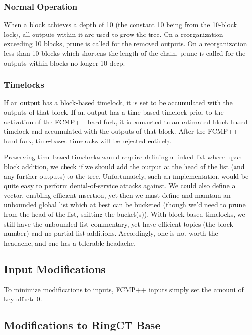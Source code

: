 \documentclass[]{article}
\begin{document}
\subsubsection{Normal Operation}

When a block achieves a depth of 10 (the constant 10 being from the 10-block lock), all outputs within it are used to grow the tree. On a reorganization exceeding 10 blocks, prune is called for the removed outputs. On a reorganization less than 10 blocks which shortens the length of the chain, prune is called for the outputs within blocks no-longer 10-deep.

\subsubsection{Timelocks}

If an output has a block-based timelock, it is set to be accumulated with the outputs of that block. If an output has a time-based timelock prior to the activation of the FCMP++ hard fork, it is converted to an estimated block-based timelock and accumulated with the outputs of that block. After the FCMP++ hard fork, time-based timelocks will be rejected entirely.

Preserving time-based timelocks would require defining a linked list where upon block addition, we check if we should add the output at the head of the list (and any further outputs) to the tree. Unfortunately, such an implementation would be quite easy to perform denial-of-service attacks against. We could also define a vector, enabling efficient insertion, yet then we must define and maintain an unbounded global list which at best can be bucketed (though we'd need to prune from the head of the list, shifting the bucket(s)). With block-based timelocks, we still have the unbounded list commentary, yet have efficient topics (the block number) and no partial list additions. Accordingly, one is not worth the headache, and one has a tolerable headache.

\subsection{Input Modifications}

To minimize modifications to inputs, FCMP++ inputs simply set the amount of key offsets 0.

\subsection{Modifications to RingCT Base}
\end{document}
